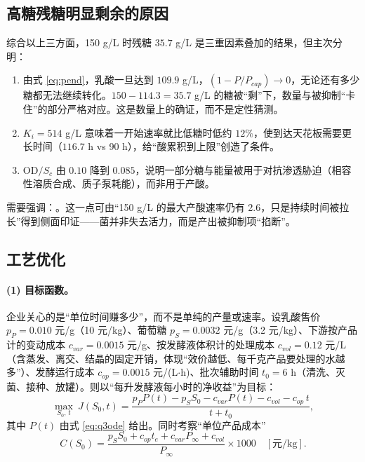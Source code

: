 \subsection{高糖残糖明显剩余的原因}
综合以上三方面，150 g/L 时残糖 $35.7$ g/L 是三重因素叠加的结果，但主次分明：

\begin{enumerate}[leftmargin=2.2em,itemsep=0.12em]
\item {}由式 \eqref{eq:pend}，乳酸一旦达到 $109.9$ g/L，$(1-P/P_{cap})\to0$，无论还有多少糖都无法继续转化。$150-114.3=35.7$ g/L 的糖被“剩”下，数量与被抑制“卡住”的部分严格对应。这是数量上的确证，而不是定性猜测。
\item {}$K_i=514$ g/L 意味着一开始速率就比低糖时低约 $12\%$，使到达天花板需要更长时间（$116.7$ h vs 90 h），给“酸累积到上限”创造了条件。
\item {}OD$/S_c$ 由 $0.10$ 降到 $0.085$，说明一部分糖与能量被用于对抗渗透胁迫（相容性溶质合成、质子泵耗能），而非用于产酸。
\end{enumerate}

需要强调：。这一点可由“150 g/L 的最大产酸速率仍有 2.6，只是持续时间被拉长”得到侧面印证——菌并非失去活力，而是产出被抑制项“掐断”。

\subsection{工艺优化}

\paragraph{(1) 目标函数。}企业关心的是“单位时间赚多少”，而不是单纯的产量或速率。设乳酸售价 $p_P=0.010$ 元/g（10 元/kg）、葡萄糖 $p_S=0.0032$ 元/g（3.2 元/kg）、下游按产品计的变动成本 $c_{var}=0.0015$ 元/g、按发酵液体积计的处理成本 $c_{vol}=0.12$ 元/L（含蒸发、离交、结晶的固定开销，体现“效价越低、每千克产品要处理的水越多”）、发酵运行成本 $c_{op}=0.0015$ 元/(L$\cdot$h)、批次辅助时间 $t_0=6$ h（清洗、灭菌、接种、放罐）。则以“每升发酵液每小时的净收益”为目标：
\begin{equation}
\max_{S_0,\,t}\ J(S_0,t)=\frac{p_P P(t)-p_S S_0-c_{var}P(t)-c_{vol}-c_{op}\,t}{t+t_0},
\label{eq:J}
\end{equation}
其中 $P(t)$ 由式 \eqref{eq:q3ode} 给出。同时考察“单位产品成本”
\begin{equation}
C(S_0)=\frac{p_S S_0+c_{op}t_e+c_{var}P_\infty+c_{vol}}{P_\infty}\times1000\quad[\text{元/kg}].
\label{eq:C}
\end{equation}

